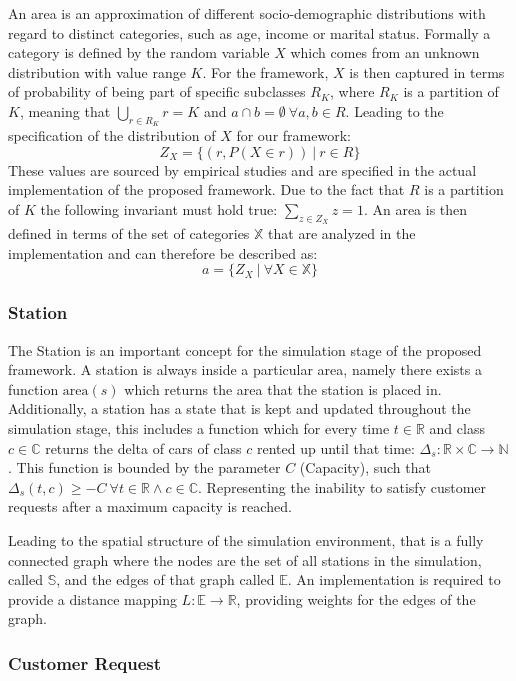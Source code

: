 An area is an approximation of different socio-demographic distributions with regard to 
distinct categories, such as age, income or marital status. Formally a category is defined by the random variable $X$ which
comes from an unknown distribution with value range $K$. For the framework, $X$ is then
captured in terms of probability of being part of specific
subclasses $R_K$, where $R_K$ is a partition of $K$, meaning that
$\bigcup_{r \in R_K} r = K$ and $a \cap b = \emptyset \ \forall a, b \in R$. Leading to the
specification of the distribution of $X$ for our framework:
$$
Z_X = \{ (r, P(X \in r)) \ |\ r \in R \}
$$
These values are sourced by empirical studies and are specified in the actual implementation
of the proposed framework.
Due to the fact that $R$ is a partition of $K$ the following invariant must hold true: $\sum_{z \in Z_X} z = 1$.
An area is then defined in terms of the set of categories $\mathbb{X}$ that are analyzed in the implementation 
and can therefore be described as:
$$
a = \{ Z_X \ | \ \forall X \in \mathbb{X} \}
$$

\subsubsection{Station}
\label{sub_sec:Method/Concepts/Station}

The Station is an important concept for the simulation stage of the proposed framework. A station is always
inside a particular area, namely there exists a function $\text{area}(s)$ which returns the area that the 
station is placed in. Additionally, a station has a state that is kept and updated throughout the simulation
stage, this includes a function which for every time $t \in \mathbb{R}$ and class $c \in \mathbb{C}$ returns
the delta of cars of class $c$ rented up until that time: $\Delta_s: \mathbb{R} \times \mathbb{C} \to \mathbb{N}$. This function
is bounded by the parameter $C$ (Capacity), such that $\Delta_s(t, c) \ge -C \ \forall t \in \mathbb{R} \land c \in \mathbb{C}$.
Representing the inability to satisfy customer requests after a maximum capacity is reached.

Leading to the spatial structure of the simulation environment, that is a fully connected graph where the nodes are 
the set of all stations in the simulation, called $\mathbb{S}$, and the edges of that graph called $\mathbb{E}$. An implementation
is required to provide a distance mapping $L: \mathbb{E} \to \mathbb{R}$, providing weights for the edges of the graph.

\subsubsection{Customer Request}
\label{sub_sec:Method/Concepts/Request}

